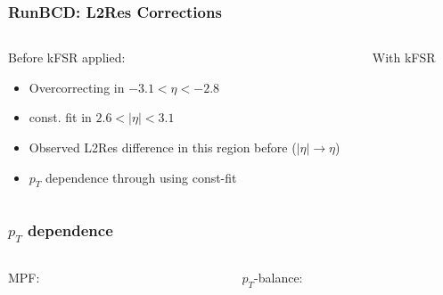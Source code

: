 \documentclass[t,compress]{beamer}
\begin{document}
\begin{frame}
\frametitle{RunBCD: L2Res Corrections}
\vspace{-0.4cm}
\begin{columns}
 \begin{column}{0.5\textwidth}
 \vspace{-0.4cm}
 Before kFSR applied:
  \begin{figure}
\end{figure}
\vspace{-0.5cm}
\begin{itemize}
 \item Overcorrecting in $-3.1 < \eta < -2.8$
 \item const. fit in $2.6 < |\eta| <3.1$
 \item Observed L2Res difference in this region before ($|\eta| \to \eta$)
 \item $p_T$ dependence through using const-fit  
\end{itemize}
 \end{column}
\begin{column}{0.5\textwidth}
With kFSR
\vspace{-0.4cm}
\begin{figure}
\end{figure}
\vspace{-1cm}
\begin{figure}
\end{figure}
 \end{column}
 \end{columns}
 \end{frame}



\begin{frame}
\frametitle{$p_T$ dependence}
\begin{columns}
 \begin{column}{0.5\textwidth}
 MPF:
  \begin{figure}
\end{figure}
 \end{column}
\begin{column}{0.5\textwidth}
$p_T$-balance:
 \begin{figure}
\end{figure}
\end{column}
\end{columns}
\end{frame}
\end{document}
